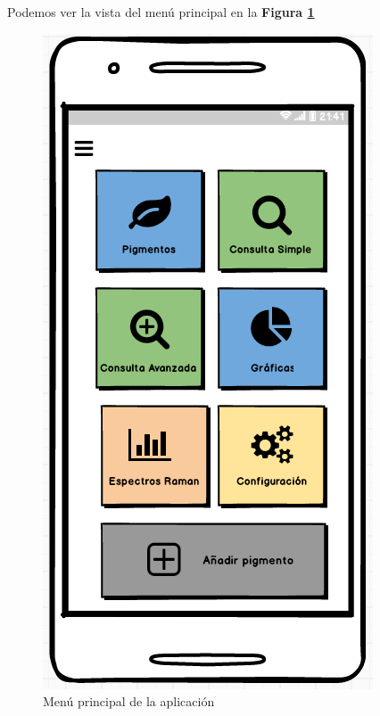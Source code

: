 Podemos ver la vista del menú principal en la \textbf{Figura \ref{fig:menuPrincipal}}

\newpage
\begin{multicols}{2}
    \begin{figure}[H]
    \centering
    \includegraphics[scale=0.6]{imagenes/diseno/main.png}
    \caption{Menú principal de la aplicación}
    \label{fig:menuPrincipal}
    \end{figure}
    

\end{multicols}
